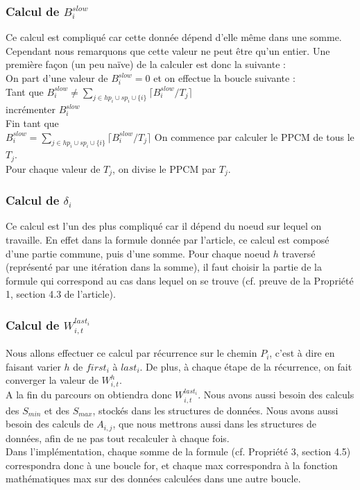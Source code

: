 \documentclass[10pt,a4paper]{article}
\begin{document}
\subsubsection{Calcul de $B_i^{slow}$}
Ce calcul est compliqué car cette donnée dépend d'elle même dans une somme. Cependant 
nous remarquons que cette valeur ne peut être qu'un entier. Une première façon (un peu naïve) 
de la calculer est donc la suivante :\\
\linebreak
On part d'une valeur de $B_i^{slow} = 0$ et on effectue la boucle suivante :\\
Tant que $B_i^{slow} \neq \sum \limits _{j \in hp_i \cup sp_i \cup \{i\}} 
\lceil B_i^{slow}/T_ j\rceil$\\
\hspace{4em} incrémenter $B_i^{slow}$\\
Fin tant que\\
\linebreak
$B_i^{slow} = \sum \limits _{j \in hp_i \cup sp_i \cup \{i\}} 
\lceil B_i^{slow}/T_ j\rceil$
On commence par calculer le PPCM de tous le $T_j$.\\
Pour chaque valeur de $T_j$, on divise le PPCM par $T_j$.



\subsubsection{Calcul de $\delta_i$}
Ce calcul est l'un des plus compliqué car il dépend du noeud sur lequel on 
travaille. En effet dans la formule donnée par l'article, ce calcul est composé 
d'une partie commune, puis d'une somme. Pour chaque noeud $h$ traversé 
(représenté par une itération dans la somme), il faut choisir la partie de la 
formule qui correspond au cas dans lequel on se trouve (cf. preuve de la 
Propriété 1, section 4.3 de l'article).

\subsubsection{Calcul de $W_{i,t}^{last_i}$}

Nous allons effectuer ce calcul par récurrence sur le chemin $P_i$, c'est à 
dire en faisant varier $h$ de $first_i$ à $last_i$. De plus, à chaque étape de 
la récurrence, on fait converger la valeur de $W_{i,t}^h$.\\
A la fin du parcours on obtiendra donc $W_{i,t}^{last_i}$. 
Nous avons aussi besoin des calculs des ${S_{min}}$ et des 
$S_{max}$, stockés dans les
structures de données. Nous avons aussi besoin des calculs de $A_{i,j}$, que nous mettrons aussi 
dans les structures de données, afin de ne pas tout recalculer à chaque fois.\\
Dans l'implémentation, chaque somme de la formule (cf. Propriété 3, section 
4.5) correspondra donc à une boucle for, et chaque max correspondra à la 
fonction mathématiques max sur des données calculées dans une autre boucle.
\end{document}
